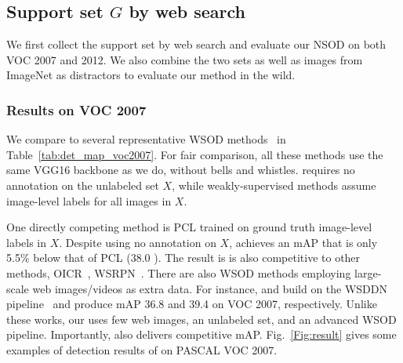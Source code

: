 \subsection{{Support set $G$ by web search}}
\label{sec:web}
{We first collect the support set by web search and evaluate our NSOD on both VOC 2007 and 2012. We also combine the two sets as well as images from ImageNet as distractors to evaluate our method in the wild.}

\subsubsection{Results on VOC 2007}\label{sec:results-voc2007}
We compare to several representative WSOD methods~\cite{wsddn,tang2017cvpr,tang2018eccv,tang2018pami,shen2019cvpr} in Table~\ref{tab:det_map_voc2007}. For fair comparison, all these methods use the same VGG16 backbone as we do, without bells and whistles.
\ours requires no annotation on the unlabeled set $X$, while weakly-supervised methods assume image-level labels for all images in $X$.

One directly competing method is PCL trained on gro\-und truth image-level labels in $X$. Despite using no annotation on $X$, \ours achieves an mAP that is only 5.5\% below that of PCL (38.0 ). The result is is also competitive to other methods, \eg OICR~\cite{tang2017cvpr}, WSRPN~\cite{tang2018pami}. {There are also WSOD methods employing large-scale web images/videos as extra data. For instance, \cite{tao2018tmm} and \cite{singh2019cvpr} build on the WSDDN pipeline~\cite{wsddn} and produce mAP 36.8 and 39.4 on VOC 2007, respectively. Unlike these works, our \ours uses few web images, an unlabeled set, and an advanced WSOD pipeline. Importantly, \ours also delivers competitive mAP.}
Fig.~\ref{Fig:result} gives some examples of detection results of \ours on PASCAL VOC 2007.

 

